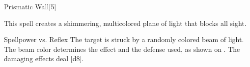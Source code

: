 \begin{spellsection}{Prismatic Wall}[5]
    \begin{spellheader}
    \end{spellheader}
    \begin{spellcontent}
        \begin{spelltargetinginfo}
        \end{spelltargetinginfo}
        \begin{spelleffects}
            \spelleffect This spell creates a shimmering, multicolored plane of light that blocks all sight.
            \spelldur \durshort \dismissable
        \end{spelleffects}
    \end{spellcontent}
    \begin{spellsubcontent}
        \begin{spelltargetinginfo}
        \end{spelltargetinginfo}
        \begin{spelleffects}
            \begin{spellattack}{Spellpower vs. Reflex}
                \spellspecial The target is struck by a randomly colored beam of light. The beam color determines the effect and the defense used, as shown on . The damaging effects deal \spelldamage{}[d8].
            \end{spellattack}
        \end{spelleffects}
    \end{spellsubcontent}
    \begin{spellfooter}
        \miscastexplode
    \end{spellfooter}
\end{spellsection}

